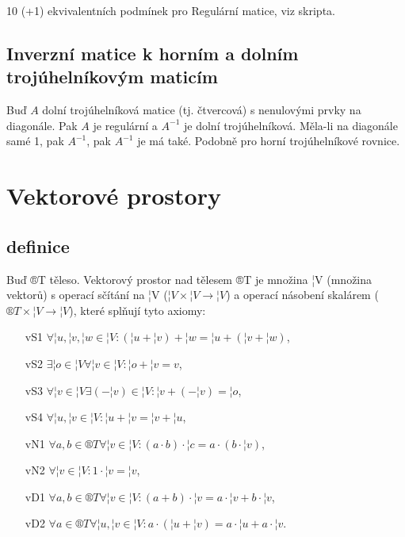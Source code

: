 \documentclass[12pt]{article}					%
\begin{document}
        \begin{veta}[V4.81 (+ T4.88)]
            10 (+1) ekvivalentních podmínek pro Regulární matice, viz skripta.
        \end{veta}

    \subsection{Inverzní matice k horním a dolním trojúhelníkovým maticím}
        \begin{tvrzeni}[T4.98]
            Buď $A$ dolní trojúhelníková matice (tj. čtvercová) s nenulovými prvky na diagonále. Pak $A$ je regulární a $A^{-1}$ je dolní trojúhelníková. Měla-li na diagonále samé 1, pak $A^{-1}$, pak $A^{-1}$ je má také. Podobně pro horní trojúhelníkové rovnice.
        \end{tvrzeni}


\section{Vektorové prostory}
    \subsection{definice}
        \begin{definice}
            Buď ®T těleso. Vektorový prostor nad tělesem ®T je množina ¦V (množina vektorů) s operací sčítání na ¦V ($¦V\times ¦V \rightarrow ¦V$) a operací násobení skalárem ($®T\times ¦V \rightarrow ¦V$), které splňují tyto axiomy:
            \begin{itemize}
                \item[vS1] $\forall ¦u, ¦v, ¦w \in ¦V: (¦u + ¦v) + ¦w = ¦u + (¦v + ¦w)$,
                \item[vS2] $\exists ¦o \in ¦V \forall ¦v \in ¦V: ¦o + ¦v = v$,
                \item[vS3] $\forall ¦v \in ¦V \exists (-¦v) \in ¦V: ¦v+(-¦v) = ¦o$,
                \item[vS4] $\forall ¦u, ¦v \in ¦V: ¦u + ¦v = ¦v + ¦u$,
                \item[vN1] $\forall a, b \in ®T \forall ¦v \in ¦V: (a·b)·¦c = a·(b·¦v)$,
                \item[vN2] $\forall ¦v \in ¦V: 1·¦v = ¦v$,
                \item[vD1] $\forall a, b \in ®T \forall ¦v \in ¦V: (a+b)·¦v = a·¦v + b·¦v$,
                \item[vD2] $\forall a \in ®T \forall ¦u, ¦v \in ¦V: a·(¦u + ¦v) = a·¦u + a·¦v$.
            \end{itemize}
        \end{definice}
\end{document}
